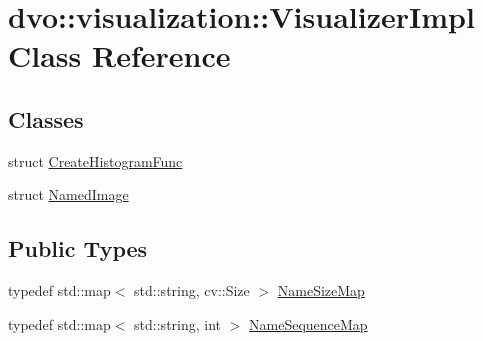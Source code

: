 \hypertarget{classdvo_1_1visualization_1_1_visualizer_impl}{}\section{dvo\+:\+:visualization\+:\+:Visualizer\+Impl Class Reference}
\label{classdvo_1_1visualization_1_1_visualizer_impl}
\subsection*{Classes}
\begin{DoxyCompactItemize}
\item 
struct \mbox{\hyperlink{structdvo_1_1visualization_1_1_visualizer_impl_1_1_create_histogram_func}{Create\+Histogram\+Func}}
\item 
struct \mbox{\hyperlink{structdvo_1_1visualization_1_1_visualizer_impl_1_1_named_image}{Named\+Image}}
\end{DoxyCompactItemize}
\subsection*{Public Types}
\begin{DoxyCompactItemize}
\item 
typedef std\+::map$<$ std\+::string, cv\+::\+Size $>$ \mbox{\hyperlink{classdvo_1_1visualization_1_1_visualizer_impl_a06868ed07bf4f004fd6446e92f4cda7a}{Name\+Size\+Map}}
\item 
typedef std\+::map$<$ std\+::string, int $>$ \mbox{\hyperlink{classdvo_1_1visualization_1_1_visualizer_impl_ad1bbf4cb3b9cfbb104f6a568c605119e}{Name\+Sequence\+Map}}
\end{DoxyCompactItemize}
